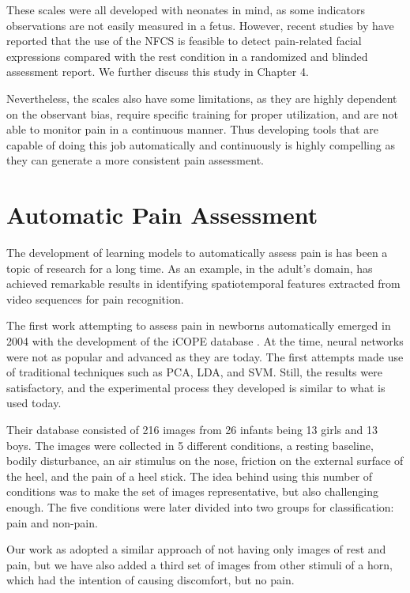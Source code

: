 These scales were all developed with neonates in mind, as some indicators observations are not easily measured in a fetus. However, recent studies by \citeauthor{bernardes2018feasibility} have reported that the use of the NFCS is feasible to detect pain-related facial expressions compared with the rest condition in a randomized and blinded assessment report. We further discuss this study in Chapter 4.

Nevertheless, the scales also have some limitations, as they are highly dependent on the observant bias, require specific training for proper utilization, and are not able to monitor pain in a continuous manner. Thus developing tools that are capable of doing this job automatically and continuously is highly compelling as they can generate a more consistent pain assessment.

\section{Automatic Pain Assessment}

The development of learning models to automatically assess pain is has been a topic of research for a long time. As an example, in the adult's domain, \citep{MauricioCVC19} has achieved remarkable results in identifying spatiotemporal features extracted from video sequences for pain recognition.

The first work attempting to assess pain in newborns automatically emerged in 2004 with the development of the iCOPE database \citep{Brahnam2006}. At the time, neural networks were not as popular and advanced as they are today. The first attempts made use of traditional techniques such as PCA, LDA, and SVM. Still, the results were satisfactory, and the experimental process they developed is similar to what is used today. 

Their database consisted of 216 images from 26 infants being 13 girls and 13 boys. The images were collected in 5 different conditions, a resting baseline, bodily disturbance, an air stimulus on the nose, friction on the external surface of the heel, and the pain of a heel stick. The idea behind using this number of conditions was to make the set of images representative, but also challenging enough. The five conditions were later divided into two groups for classification: pain and non-pain.

Our work as adopted a similar approach of not having only images of rest and pain, but we have also added a third set of images from other stimuli of a horn, which had the intention of causing discomfort, but no pain. 


